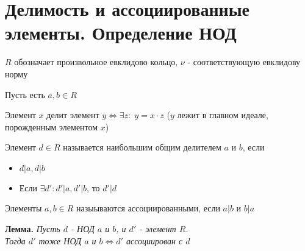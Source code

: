 \section{Делимость и ассоциированные элементы. Определение НОД}
\begin{normalsize}
    $R$ обозначает произвольное евклидово кольцо, $\nu$ - соответствующую евклидову норму
    \begin{theorem-non}
        Пусть есть $a, b \in R$
        \begin{conj}
            Элемент $x$ делит элемент $y \Longleftrightarrow \exists z: \; y = x \cdot z$ ($y$ лежит в главном идеале, порожденным элементом $x$)
        \end{conj}
        \begin{conj}
            Элемент $d \in R$ называется наибольшим общим делителем $a$ и $b$, если \begin{itemize}
                \item $d | a, d | b$
                \item Если $\exists d' : d' | a, d' | b$, то $d' | d$
            \end{itemize}
        \end{conj}
    \end{theorem-non}
        \begin{conj}
            Элементы $a, b \in R$ назыываются ассоциированными, если $a|b$ и $b|a$
        \end{conj}
        \textbf{Лемма.}
        \textit{Пусть $d$ - НОД $a$ и $b$, и $d'$ - элемент $R$. \\
        Тогда $d'$ тоже НОД $a$ и $b \Longleftrightarrow d'$ ассоциирован с $d$}
\end{normalsize}
